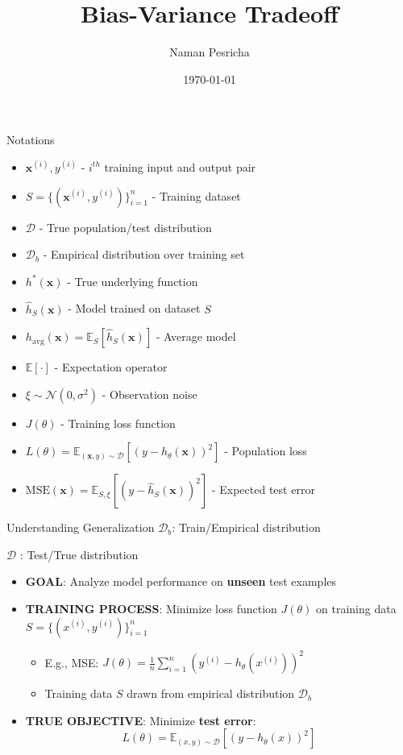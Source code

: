 \documentclass{beamer}
\title{Bias-Variance Tradeoff}
\author{Naman Pesricha}
\date{\today}
\begin{document}
\begin{frame}
    \titlepage
\end{frame}

\begin{frame}{Notations}
\begin{itemize}
    \item $\mathbf{x}^{(i)}, y^{(i)}$ - $i^{th}$ training input and output pair
    \item $S = \{(\mathbf{x}^{(i)}, y^{(i)})\}_{i=1}^n$ - Training dataset
    \item $\mathcal{D}$ - True population/test distribution
    \item $\mathcal{D}_b$ - Empirical distribution over training set
    
    \item $h^*(\mathbf{x})$ - True underlying function
    \item $\hat{h}_S(\mathbf{x})$ - Model trained on dataset $S$
    \item $h_{\text{avg}}(\mathbf{x}) = \mathbb{E}_S[\hat{h}_S(\mathbf{x})]$ - Average model
    
    \item $\mathbb{E}[\cdot]$ - Expectation operator
    \item $\xi \sim \mathcal{N}(0, \sigma^2)$ - Observation noise
    \item $J(\theta)$ - Training loss function
    \item $L(\theta) = \mathbb{E}_{(\mathbf{x},y)\sim\mathcal{D}}[(y-h_\theta(\mathbf{x}))^2]$ - Population loss
    
    \item $\text{MSE}(\mathbf{x}) = \mathbb{E}_{S,\xi}[(y-\hat{h}_S(\mathbf{x}))^2]$ - Expected test error
\end{itemize}
\end{frame}

\begin{frame}{Understanding Generalization}
    $\mathcal{D}_b$: Train/Empirical distribution
    
    $\mathcal{D}$ : Test/True distribution
    \vspace{0.5cm}
    \begin{itemize}
        \item \textbf{GOAL}: Analyze model performance on \textbf{unseen} test examples
        \item \textbf{TRAINING PROCESS}: Minimize loss function $J(\theta)$ on training data $S = \{(x^{(i)}, y^{(i)})\}_{i=1}^n$
        \begin{itemize}
            \item E.g., MSE: $J(\theta) = \frac{1}{n}\sum_{i=1}^n (y^{(i)} - h_\theta(x^{(i)}))^2$
            \item Training data $S$ drawn from empirical distribution $\mathcal{D}_b$
        \end{itemize}
        \item \textbf{TRUE OBJECTIVE}: Minimize \textbf{test error}:
        \[ L(\theta) = \mathbb{E}_{(x,y)\sim\mathcal{D}}[(y - h_\theta(x))^2] \]
    \end{itemize}
\end{frame}
\end{document}
